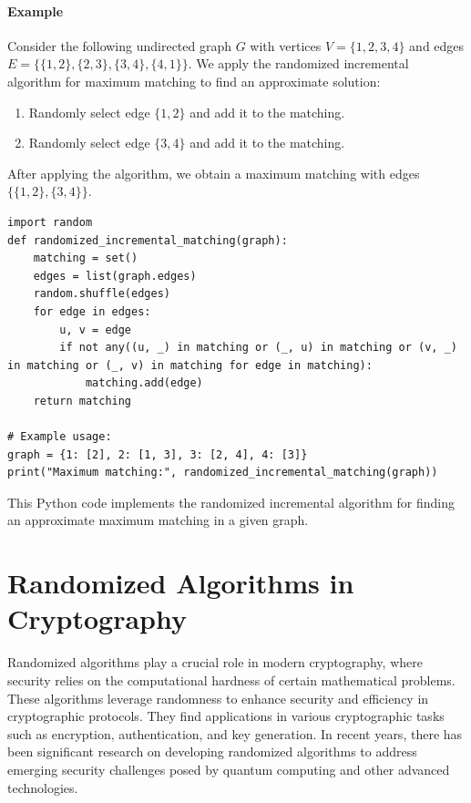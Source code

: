 \documentclass[12pt]{book} %
\begin{document}
\paragraph{Example}
Consider the following undirected graph \(G\) with vertices \(V = \{1, 2, 3, 4\}\) and edges \(E = \{\{1, 2\}, \{2, 3\}, \{3, 4\}, \{4, 1\}\}\). We apply the randomized incremental algorithm for maximum matching to find an approximate solution:

\begin{enumerate}
    \item Randomly select edge \(\{1, 2\}\) and add it to the matching.
    \item Randomly select edge \(\{3, 4\}\) and add it to the matching.
\end{enumerate}

After applying the algorithm, we obtain a maximum matching with edges $\{\{1, 2\}, \{3, 4\}\}$.

\FloatBarrier
\begin{lstlisting}
import random
def randomized_incremental_matching(graph):
    matching = set()
    edges = list(graph.edges)
    random.shuffle(edges)
    for edge in edges:
        u, v = edge
        if not any((u, _) in matching or (_, u) in matching or (v, _) in matching or (_, v) in matching for edge in matching):
            matching.add(edge)
    return matching

# Example usage:
graph = {1: [2], 2: [1, 3], 3: [2, 4], 4: [3]}
print("Maximum matching:", randomized_incremental_matching(graph))
\end{lstlisting}
\FloatBarrier

This Python code implements the randomized incremental algorithm for finding an approximate maximum matching in a given graph.

\section{Randomized Algorithms in Cryptography}

Randomized algorithms play a crucial role in modern cryptography, where security relies on the computational hardness of certain mathematical problems. These algorithms leverage randomness to enhance security and efficiency in cryptographic protocols. They find applications in various cryptographic tasks such as encryption, authentication, and key generation. In recent years, there has been significant research on developing randomized algorithms to address emerging security challenges posed by quantum computing and other advanced technologies.
\end{document}
